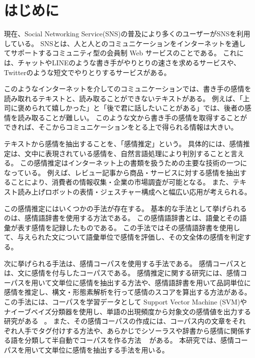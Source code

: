 \documentclass[11pt,a4j]{jsarticle}
\begin{document}
 \pagestyle{plain}
 \setcounter{page}{1}
 
 
\section{はじめに}\label{sec:begin}
 現在、Social Networking Service(SNS)の普及により多くのユーザーがSNSを利用している。
SNSとは、人と人とのコミュニケーションをインターネットを通してサポートするコミュニティ型の会員制 Web サービスのことである。
これには、チャットやLINE\raisebox{.5zw}{\scalebox{.5}{\textregistered}}のような書き手がやりとりの速さを求めるサービスや、Twitter\raisebox{.5zw}{\scalebox{.5}{\textregistered}}のような短文でやりとりするサービスがある。

このようなインターネットを介してのコミュニケーションでは、書き手の感情を読み取れるテキストと、読み取ることができないテキストがある。
例えば、「上司に褒められて嬉しかった」と「後で君に話したいことがある」では、後者の感情を読み取ることが難しい。
このような文から書き手の感情を取得することができれば、そこからコミュニケーションをとる上で得られる情報は大きい。

テキストから感情を抽出することを、「感情推定」という。
具体的には、感情推定は、文中に表現されている感情を、自然言語処理により判別することと言える。
この感情推定はインターネット上の書類を扱うための主要な技術の一つになっている。
例えば、レビュー記事から商品・サービスに対する感情を抽出することにより、消費者の情報収集・企業の市場調査が可能となる。
また、テキスト読み上げロボットの表情・ジェスチャー構成へと幅広い応用が考えられる。

この感情推定にはいくつかの手法が存在する。
基本的な手法として挙げられるのは、感情語辞書を使用する方法である。
この感情語辞書とは、語彙とその語彙が表す感情を記録したものである。
この手法ではその感情語辞書を使用して、与えられた文について語彙単位で感情を評価し、その文全体の感情を判定する。

次に挙げられる手法は、感情コーパスを使用する手法である。
感情コーパスとは、文に感情を付与したコーパスである。
感情推定に関する研究には、感情コーパスを用いて文単位に感情を抽出する方法や、感情語辞書を用いて品詞単位に感情を推定し、構文・形態素解析を行って感情のスコアを算出する方法がある。
この手法には、コーパスを学習データとして Support Vector Machine (SVM)やナイーブベイズ分類器を使用し、単語の出現頻度から対象文の感情値を出力する研究がある ~。
また、その感情コーパスの作成には、コーパス内の文章をそれぞれ人手でタグ付けする方法や、あらかじでシソーラスや辞書から感情に関係する語を分類して半自動でコーパスを作る方法 ~ がある。
本研究では、感情コーパスを用いて文単位に感情を抽出する手法を用いる。
\end{document}
